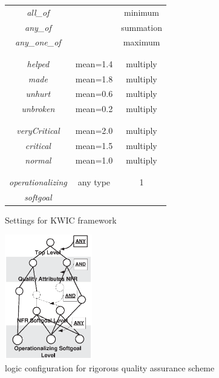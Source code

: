 \documentclass[twocolumn]{styles/IEEEtran}
\begin{document}
\begin{figure}[h]
\begin{center}
\begin{footnotesize}
 \begin{tabular}[t]{|c|c|c|} \hline
 {\verb1<combine_logic>1}	& {\verb1<op>1} 	& {\verb1<arithmetic[op]>1}\\ \hline
 {\sl all\_of}		& {\verb1rand1}	& minimum \\
 {\sl any\_of}		& {\verb1rany1}	& summation \\
 {\sl any\_one\_of}		& {\verb1ror1}	& maximum \\ \hline
 {\verb1<contribution>1}	& {\verb1<value>1} 		& {\verb1<arithmetic>1}\\ 
 			& {\verb1[contribution]1} 		& {\verb1[contribution]1}\\ \hline
 {\sl helped}		& mean=1.4			& multiply \\
 {\sl made}		& mean=1.8			& multiply \\
 {\sl unhurt}		& mean=0.6			& multiply \\
 {\sl unbroken}		& mean=0.2			& multiply \\ \hline
 {\verb1<priority>1}		& {\verb1<value>1} 		& {\verb1<arithmetic>1}\\
 			& {\verb1[priority]1} 		& {\verb1[priority]1}\\ \hline
 {\sl veryCritical}		& mean=2.0			& multiply \\
 {\sl critical}		& mean=1.5			& multiply \\
 {\sl normal}		& mean=1.0			& multiply \\ \hline
 {\verb1<softgoal>1}	& {\verb1<softgoalType>1} 		& {\verb1<cost>1}	\\
 			& {\verb1[softgoal]1} 		&  {\verb1[softgoalType]1}  \\ \hline
 {\sl operationalizing}	&  any type			& 1\\ 
 {\sl softgoal	}	&  				& \\ \hline
 \end{tabular}
\end{footnotesize}
\end{center}
 \caption{Settings for KWIC framework}
\label{fig:arch_def_rigorous_config}
\end{figure} 

\begin{figure}[h]
\begin{center}
\includegraphics[width=1.5in]{fig/arch_def_rigorous_graph.eps}

\end{center}
\caption{logic configuration for rigorous quality assurance scheme}
\label{fig:arch_def_rigorous_graph}
\end{figure}
\end{document}
